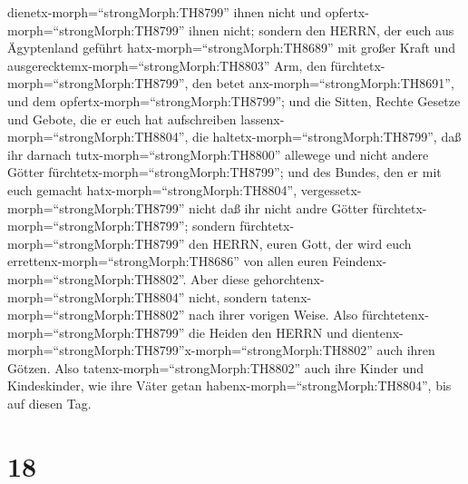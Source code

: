 dienetx-morph=``strongMorph:TH8799'' ihnen nicht und
opfertx-morph=``strongMorph:TH8799'' ihnen nicht;  sondern
den HERRN, der euch aus Ägyptenland geführt
hatx-morph=``strongMorph:TH8689'' mit großer Kraft und
ausgerecktemx-morph=``strongMorph:TH8803'' Arm, den
fürchtetx-morph=``strongMorph:TH8799'', den betet
anx-morph=``strongMorph:TH8691'', und dem
opfertx-morph=``strongMorph:TH8799'';  und die Sitten,
Rechte Gesetze und Gebote, die er euch hat aufschreiben
lassenx-morph=``strongMorph:TH8804'', die
haltetx-morph=``strongMorph:TH8799'', daß ihr darnach
tutx-morph=``strongMorph:TH8800'' allewege und nicht andere Götter
fürchtetx-morph=``strongMorph:TH8799'';  und des Bundes,
den er mit euch gemacht hatx-morph=``strongMorph:TH8804'',
vergessetx-morph=``strongMorph:TH8799'' nicht daß ihr nicht andre Götter
fürchtetx-morph=``strongMorph:TH8799'';  sondern
fürchtetx-morph=``strongMorph:TH8799'' den HERRN, euren Gott, der wird
euch errettenx-morph=``strongMorph:TH8686'' von allen euren
Feindenx-morph=``strongMorph:TH8802''.  Aber diese
gehorchtenx-morph=``strongMorph:TH8804'' nicht, sondern
tatenx-morph=``strongMorph:TH8802'' nach ihrer vorigen Weise.
 Also fürchtetenx-morph=``strongMorph:TH8799'' die Heiden
den HERRN und
dientenx-morph=``strongMorph:TH8799''x-morph=``strongMorph:TH8802'' auch
ihren Götzen. Also tatenx-morph=``strongMorph:TH8802'' auch ihre Kinder
und Kindeskinder, wie ihre Väter getan
habenx-morph=``strongMorph:TH8804'', bis auf diesen Tag.

\hypertarget{section-17}{%
\section{18}\label{section-17}}

